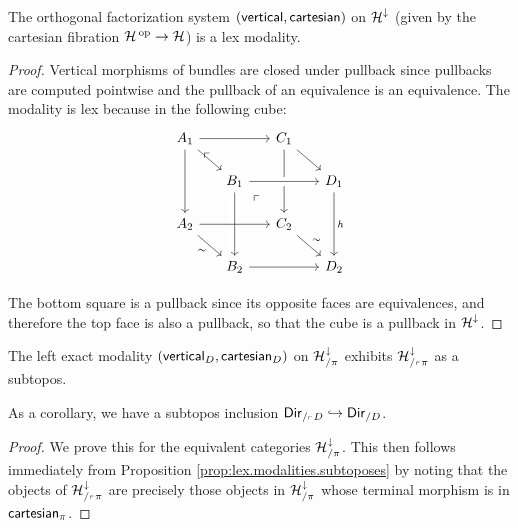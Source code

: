 \begin{prop}
The orthogonal factorization system $(\mathsf{{vertical}}, \mathsf{{cartesian}})$ on
$\operatorname{\mathcal{H}}^{\downarrow}$ (given by the cartesian fibration $\operatorname{\mathcal{H}}\operatorname{^\textnormal{op}} \to \operatorname{\mathcal{H}}$) is a
lex modality.
\end{prop}
\begin{proof}

  Vertical morphisms of bundles are closed under pullback since pullbacks are
computed pointwise and the pullback of an equivalence is an equivalence. The
modality is lex because in the following cube:
\[
    \begin{tikzcd}[row sep=1.5em, column sep = 1.5em]
    A_1 \arrow[rr] \arrow[dr, crossing over] \arrow[dd,swap] \arrow[ddrr, phantom, "\ulcorner"
    very near start] &&
    C_1 \arrow[dd] \arrow[dr] \\
    & B_1 \arrow[rr, crossing over]\arrow[dd, crossing over] \arrow[ddrr,
    phantom, "\ulcorner" very near start]&&
    D_1 \arrow[dd,"h"] \\
    A_2 \arrow[rr,] \arrow[dr, "\sim"'] && C_2 \arrow[dr, "\sim"] \\
    & B_2 \arrow[rr] && D_2 
    \end{tikzcd}
\]

The bottom square is a pullback since its opposite faces are equivalences, and
therefore the top face is also a pullback, so that the cube is a pullback in $\operatorname{\mathcal{H}}^{\mathbin{\downarrow}}$.
\end{proof}

\begin{thm}
The left exact modality $(\mathsf{{vertical}}_D, \mathsf{{cartesian}}_D)$ on
$\operatorname{\mathcal{H}}^{\downarrow}_{/\pi}$ exhibits $\operatorname{\mathcal{H}}^{\downarrow}_{/_{\ulcorner} \pi}$ as a
subtopos.

As a corollary, we have a subtopos inclusion $\operatorname{\mathsf{{Dir}}}_{/_{\ulcorner} D}
\hookrightarrow \operatorname{\mathsf{{Dir}}}_{/D}$. 
\end{thm}
\begin{proof}
We prove this for the equivalent categories $\operatorname{\mathcal{H}}^{\mathbin{\downarrow}}_{/\pi}$. This then
follows immediately from Proposition \ref{prop:lex.modalities.subtoposes} by
noting that the objects of $\operatorname{\mathcal{H}}^{\mathbin{\downarrow}}_{/_{\ulcorner} \pi}$ are precisely those objects
in $\operatorname{\mathcal{H}}^{\mathbin{\downarrow}}_{/\pi}$ whose terminal morphism is in $\mathsf{{cartesian}}_{\pi}$.
\end{proof}

